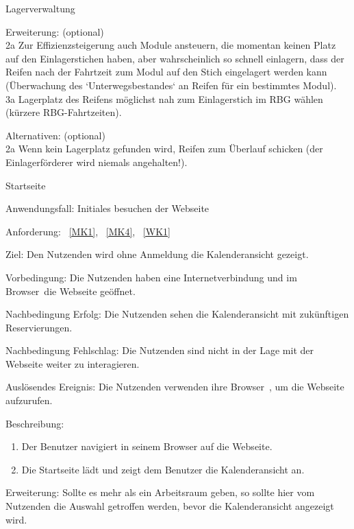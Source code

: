 \begin{function}{10}{Lagerverwaltung}
\begin{enumerate}
    \end{enumerate}
    \item[Erweiterung:] (optional)\\
        2a Zur Effizienzsteigerung auch Module ansteuern, die momentan keinen Platz auf
        den Einlagerstichen haben, aber wahrscheinlich so schnell einlagern, dass der
        Reifen nach der Fahrtzeit zum Modul auf den Stich eingelagert werden kann
        (Überwachung des `Unterwegsbestandes` an Reifen für ein bestimmtes
        Modul).\\
        3a Lagerplatz des Reifens möglichst nah zum Einlagerstich im RBG wählen	(kürzere RBG-Fahrtzeiten).
    \item[Alternativen:] (optional)\\
        2a Wenn kein Lagerplatz gefunden wird, Reifen zum Überlauf schicken (der
        Einlagerförderer wird niemals angehalten!).
\end{function}
\fi

\begin{function}{10}{Startseite}
    \item[Anwendungsfall:] Initiales besuchen der Webseite
    \item[Anforderung:]~\ref{MK1}, ~\ref{MK4}, ~\ref{WK1}
    \item[Ziel:] Den Nutzenden wird ohne Anmeldung die Kalenderansicht gezeigt.
    \item[Vorbedingung:] Die Nutzenden haben eine Internetverbindung und im \gls{Browser}~die Webseite geöffnet.
    \item[Nachbedingung Erfolg:] Die Nutzenden sehen die Kalenderansicht mit zukünftigen Reservierungen.
    \item[Nachbedingung Fehlschlag:] Die Nutzenden sind nicht in der Lage mit der Webseite weiter zu interagieren.
    \item[Auslösendes Ereignis:] Die Nutzenden verwenden ihre \gls{Browser}~, um die Webseite aufzurufen.
    \item[Beschreibung:]~
    \begin{enumerate}
        \item Der Benutzer navigiert in seinem Browser auf die Webseite.
        \item Die Startseite lädt und zeigt dem Benutzer die Kalenderansicht an.
    \end{enumerate}
    \item[Erweiterung:] Sollte es mehr als ein Arbeitsraum geben, so sollte hier vom Nutzenden die Auswahl getroffen werden, bevor die Kalenderansicht angezeigt wird.
\end{function}

